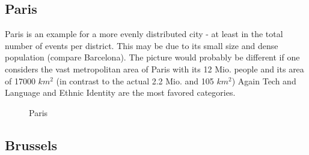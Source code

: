 \subsection*{Paris}

Paris is an example for a more evenly distributed city - at least in the total number of events per district. This may be due to its small size and dense population (compare Barcelona). The picture would probably be different if one considers the vast metropolitan area of Paris with its 12 Mio. people and its area of 17000 $ km^2 $ (in contrast to the actual 2.2 Mio. and 105 $ km^2 $)
Again Tech and Language and Ethnic Identity are the most favored categories. 

\begin{figure}[!htp]
	\hfill
	\caption{Paris}
\end{figure}


\subsection*{Brussels}

